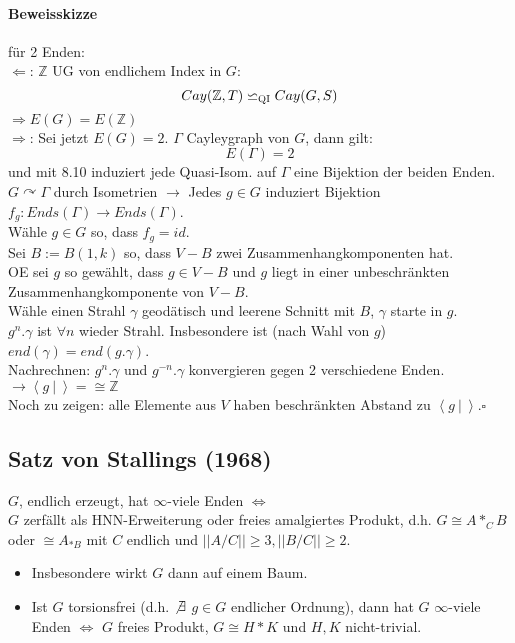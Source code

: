 \documentclass{article}
\newcommand{\Z}{\mathbb{Z}}
\newcommand{\grp}[2]{\left\langle #1~|~#2 \right\rangle}
\newcommand{\qed}{\hfill $\square$}
\newcommand{\qi}{\backsimeq_{\textsc{QI}}}
\newcommand{\norm}[1]{\left|\left|#1\right|\right|}
\begin{document}
\paragraph{Beweisskizze} für 2 Enden:\\
$\Longleftarrow$: $\Z$ UG von endlichem Index in $G$:
\[Cay(\Z, T)  \qi Cay(G,S) \]
$\Longrightarrow E(G) = E(\Z)$\\

$\Longrightarrow$: 
Sei jetzt $E(G) = 2$. $\Gamma$ Cayleygraph von $G$, dann gilt:
\[E(\Gamma) = 2\]
und mit 8.10 induziert jede Quasi-Isom. auf $\Gamma$ eine Bijektion der beiden Enden.\\
$G \curvearrowright \Gamma$ durch Isometrien $\rightarrow$ Jedes $g \in G$ induziert Bijektion $f_g : Ends(\Gamma) \rightarrow Ends(\Gamma)$.\\
Wähle $g \in G$ so, dass $f_g = id$.\\
Sei $B:=B(1,k)$ so, dass $V-B$ zwei Zusammenhangkomponenten hat.\\
OE sei $g$ so gewählt, dass $g\in V-B$ und $g$ liegt in einer unbeschränkten Zusammenhangkomponente von $V-B$. \\
Wähle einen Strahl $\gamma$ geodätisch und leerene Schnitt mit $B$, $\gamma$ starte in $g$.\\
$g^n.\gamma$ ist $\forall n$ wieder Strahl. Insbesondere ist (nach Wahl von $g$) $end(\gamma) = end(g.\gamma)$.\\
Nachrechnen: $g^n.\gamma$ und $g^{-n}.\gamma$ konvergieren gegen 2 verschiedene Enden. $\rightarrow \grp{g}{} = \cong \Z$\\
Noch zu zeigen: alle Elemente aus $V$ haben beschränkten Abstand zu $\grp{g}{}$.\qed

\subsection{Satz von Stallings (1968)}
$G$, endlich erzeugt, hat $\infty$-viele Enden $\Longleftrightarrow$\\
$G$ zerfällt als HNN-Erweiterung oder freies amalgiertes Produkt, d.h. $G \cong A *_C B$ oder $\cong A_{*B}$ mit $C$ endlich und $\norm{A/C} \geq 3, \norm{B/C} \geq 2$.
\begin{itemize}
	\item Insbesondere wirkt $G$ dann auf einem Baum.
	\item Ist $G$ torsionsfrei (d.h. $\not \exists$ $g\in G$ endlicher Ordnung), dann hat $G$ $\infty$-viele Enden $\Longleftrightarrow$ $G$ freies Produkt, $G \cong H * K$ und $H,K$ nicht-trivial.
\end{itemize}

\end{document}
